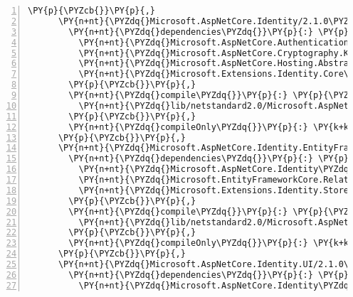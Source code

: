 \begin{Verbatim}[commandchars=\\\{\},numbers=left,firstnumber=1,stepnumber=1,numberblanklines=0]
      \PY{p}{\PYZcb{}}\PY{p}{,}
      \PY{n+nt}{\PYZdq{}Microsoft.AspNetCore.Identity/2.1.0\PYZhy{}rc1\PYZhy{}final\PYZdq{}}\PY{p}{:} \PY{p}{\PYZob{}}
        \PY{n+nt}{\PYZdq{}dependencies\PYZdq{}}\PY{p}{:} \PY{p}{\PYZob{}}
          \PY{n+nt}{\PYZdq{}Microsoft.AspNetCore.Authentication.Cookies\PYZdq{}}\PY{p}{:} \PY{l+s+s2}{\PYZdq{}2.1.0\PYZhy{}rc1\PYZhy{}final\PYZdq{}}\PY{p}{,}
          \PY{n+nt}{\PYZdq{}Microsoft.AspNetCore.Cryptography.KeyDerivation\PYZdq{}}\PY{p}{:} \PY{l+s+s2}{\PYZdq{}2.1.0\PYZhy{}rc1\PYZhy{}final\PYZdq{}}\PY{p}{,}
          \PY{n+nt}{\PYZdq{}Microsoft.AspNetCore.Hosting.Abstractions\PYZdq{}}\PY{p}{:} \PY{l+s+s2}{\PYZdq{}2.1.0\PYZhy{}rc1\PYZhy{}final\PYZdq{}}\PY{p}{,}
          \PY{n+nt}{\PYZdq{}Microsoft.Extensions.Identity.Core\PYZdq{}}\PY{p}{:} \PY{l+s+s2}{\PYZdq{}2.1.0\PYZhy{}rc1\PYZhy{}final\PYZdq{}}
        \PY{p}{\PYZcb{}}\PY{p}{,}
        \PY{n+nt}{\PYZdq{}compile\PYZdq{}}\PY{p}{:} \PY{p}{\PYZob{}}
          \PY{n+nt}{\PYZdq{}lib/netstandard2.0/Microsoft.AspNetCore.Identity.dll\PYZdq{}}\PY{p}{:} \PY{p}{\PYZob{}}\PY{p}{\PYZcb{}}
        \PY{p}{\PYZcb{}}\PY{p}{,}
        \PY{n+nt}{\PYZdq{}compileOnly\PYZdq{}}\PY{p}{:} \PY{k+kc}{true}
      \PY{p}{\PYZcb{}}\PY{p}{,}
      \PY{n+nt}{\PYZdq{}Microsoft.AspNetCore.Identity.EntityFrameworkCore/2.1.0\PYZhy{}rc1\PYZhy{}final\PYZdq{}}\PY{p}{:} \PY{p}{\PYZob{}}
        \PY{n+nt}{\PYZdq{}dependencies\PYZdq{}}\PY{p}{:} \PY{p}{\PYZob{}}
          \PY{n+nt}{\PYZdq{}Microsoft.AspNetCore.Identity\PYZdq{}}\PY{p}{:} \PY{l+s+s2}{\PYZdq{}2.1.0\PYZhy{}rc1\PYZhy{}final\PYZdq{}}\PY{p}{,}
          \PY{n+nt}{\PYZdq{}Microsoft.EntityFrameworkCore.Relational\PYZdq{}}\PY{p}{:} \PY{l+s+s2}{\PYZdq{}2.1.0\PYZhy{}rc1\PYZhy{}final\PYZdq{}}\PY{p}{,}
          \PY{n+nt}{\PYZdq{}Microsoft.Extensions.Identity.Stores\PYZdq{}}\PY{p}{:} \PY{l+s+s2}{\PYZdq{}2.1.0\PYZhy{}rc1\PYZhy{}final\PYZdq{}}
        \PY{p}{\PYZcb{}}\PY{p}{,}
        \PY{n+nt}{\PYZdq{}compile\PYZdq{}}\PY{p}{:} \PY{p}{\PYZob{}}
          \PY{n+nt}{\PYZdq{}lib/netstandard2.0/Microsoft.AspNetCore.Identity.EntityFrameworkCore.dll\PYZdq{}}\PY{p}{:} \PY{p}{\PYZob{}}\PY{p}{\PYZcb{}}
        \PY{p}{\PYZcb{}}\PY{p}{,}
        \PY{n+nt}{\PYZdq{}compileOnly\PYZdq{}}\PY{p}{:} \PY{k+kc}{true}
      \PY{p}{\PYZcb{}}\PY{p}{,}
      \PY{n+nt}{\PYZdq{}Microsoft.AspNetCore.Identity.UI/2.1.0\PYZhy{}rc1\PYZhy{}final\PYZdq{}}\PY{p}{:} \PY{p}{\PYZob{}}
        \PY{n+nt}{\PYZdq{}dependencies\PYZdq{}}\PY{p}{:} \PY{p}{\PYZob{}}
          \PY{n+nt}{\PYZdq{}Microsoft.AspNetCore.Identity\PYZdq{}}\PY{p}{:} \PY{l+s+s2}{\PYZdq{}2.1.0\PYZhy{}rc1\PYZhy{}final\PYZdq{}}\PY{p}{,}

\end{Verbatim}
